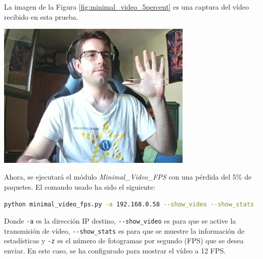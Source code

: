 \newpage

La imagen de la Figura \ref{fig:minimal_video_5percent} es una captura del vídeo recibido en esta prueba.
\begin{center}
  \includegraphics[width = 0.7\textwidth]{images/VideoRecibido7.1.png}
  \label{fig:minimal_video_5percent}
\end{center}
\newpage


Ahora, se ejecutará el módulo \textit{Minimal\_Video\_FPS} con una pérdida del 5\% de paquetes. El comando usado ha sido el siguiente:

\begin{lstlisting}[language=bash, basicstyle=\ttfamily\scriptsize]
    python minimal_video_fps.py -a 192.168.0.58 --show_video --show_stats -z 12
\end{lstlisting}
Donde \verb|-a| es la dirección IP destino, \verb|--show_video| es para que se active la transmisión de vídeo, \verb|--show_stats| es para que se muestre la información de estadísticas y \verb|-z| es el número de fotogramas por segundo (FPS) que se desea enviar. En este caso, se ha configurado para mostrar el vídeo a 12 FPS.
\vspace{\baselineskip}

